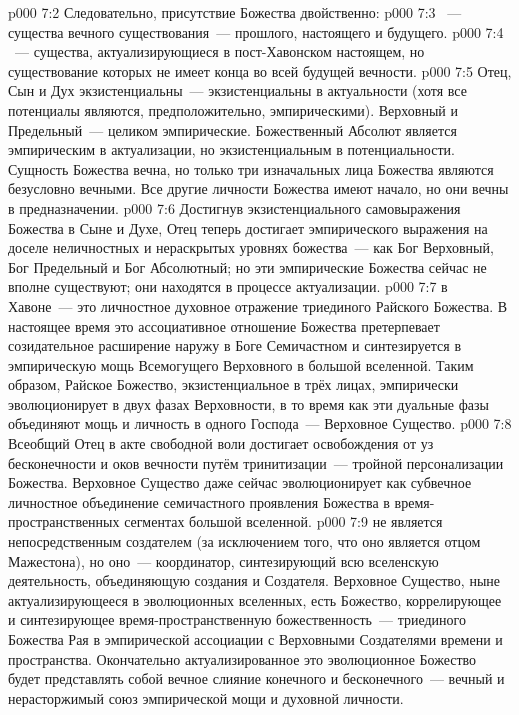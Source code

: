 \vs p000 7:2 Следовательно, присутствие Божества двойственно:
\vs p000 7:3 ~--- существа вечного существования~--- прошлого, настоящего и будущего.
\vs p000 7:4 ~--- существа, актуализирующиеся в пост\hyp{}Хавонском настоящем, но существование которых не имеет конца во всей будущей вечности.
\vs p000 7:5 \pc Отец, Сын и Дух экзистенциальны~--- экзистенциальны в актуальности (хотя все потенциалы являются, предположительно, эмпирическими). Верховный и Предельный~--- целиком эмпирические. Божественный Абсолют является эмпирическим в актуализации, но экзистенциальным в потенциальности. Сущность Божества вечна, но только три изначальных лица Божества являются безусловно вечными. Все другие личности Божества имеют начало, но они вечны в предназначении.
\vs p000 7:6 Достигнув экзистенциального самовыражения Божества в Сыне и Духе, Отец теперь достигает эмпирического выражения на доселе неличностных и нераскрытых уровнях божества~--- как Бог Верховный, Бог Предельный и Бог Абсолютный; но эти эмпирические Божества сейчас не вполне существуют; они находятся в процессе актуализации.
\vs p000 7:7 \pc {} в Хавоне~--- это личностное духовное отражение триединого Райского Божества. В настоящее время это ассоциативное отношение Божества претерпевает созидательное расширение наружу в Боге Семичастном и синтезируется в эмпирическую мощь Всемогущего Верховного в большой вселенной. Таким образом, Райское Божество, экзистенциальное в трёх лицах, эмпирически эволюционирует в двух фазах Верховности, в то время как эти дуальные фазы объединяют мощь и личность в одного Господа~--- Верховное Существо.
\vs p000 7:8 Всеобщий Отец в акте свободной воли достигает освобождения от уз бесконечности и оков вечности путём тринитизации~--- тройной персонализации Божества. Верховное Существо даже сейчас эволюционирует как субвечное личностное объединение семичастного проявления Божества в время\hyp{}пространственных сегментах большой вселенной.
\vs p000 7:9 \pc {} не является непосредственным создателем (за исключением того, что оно является отцом Мажестона), но оно~--- координатор, синтезирующий всю вселенскую деятельность, объединяющую создания и Создателя. Верховное Существо, ныне актуализирующееся в эволюционных вселенных, есть Божество, коррелирующее и синтезирующее время\hyp{}пространственную божественность~--- триединого Божества Рая в эмпирической ассоциации с Верховными Создателями времени и пространства. Окончательно актуализированное это эволюционное Божество будет представлять собой вечное слияние конечного и бесконечного~--- вечный и нерасторжимый союз эмпирической мощи и духовной личности.
